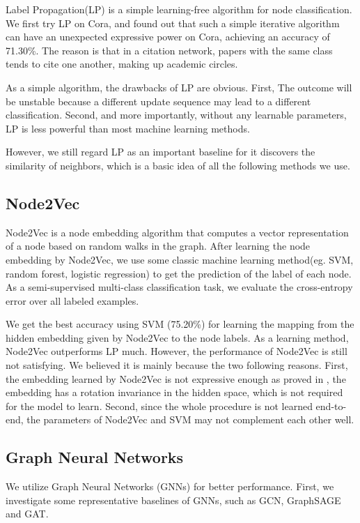 \documentclass[fleqn,10pt]{SelfArx} %
\begin{document}
Label Propagation(LP)\cite{zhuѓ2002learning} is a simple learning-free algorithm for node classification. We first try LP on Cora, and found out that such a simple iterative algorithm can have an unexpected expressive power on Cora, achieving an accuracy of 71.30\%. The reason is that in a citation network, papers with the same class tends to cite one another, making up academic circles.

As a simple algorithm, the drawbacks of LP are obvious. First, The outcome will be unstable because a different update sequence may lead to a different classification. Second, and more importantly, without any learnable parameters, LP is less powerful than most machine learning methods.

However, we still regard LP as an important baseline for it discovers the similarity of neighbors, which is a basic idea of all the following methods we use.

\subsection{Node2Vec}
Node2Vec\cite{grover2016node2vec} is a node embedding algorithm that computes a vector representation of a node based on random walks in the graph. 
After learning the node embedding by Node2Vec, we use some classic machine learning method(eg. SVM, random forest, logistic regression) to get the prediction of the label of each node. As a semi-supervised multi-class classification task, we evaluate the cross-entropy error over all labeled examples.

We get the best accuracy using SVM (75.20\%) for learning the mapping from the hidden embedding given by Node2Vec to the node labels. As a learning method, Node2Vec outperforms LP much. However, the performance of Node2Vec is still not satisfying. We believed it is mainly because the two following reasons. First, the embedding learned by Node2Vec is 
not expressive enough as proved in \cite{levy2014neural,hamilton2017inductive}, the embedding has a rotation invariance in the hidden space, which is not required for the model to learn. Second, since the whole procedure is not learned end-to-end, the parameters of Node2Vec and SVM may not complement each other well. 

\subsection{Graph Neural Networks}
We utilize Graph Neural Networks (GNNs) for better performance. First, we investigate some representative baselines of GNNs, such as GCN\cite{chen2020simple}, GraphSAGE\cite{hamilton2017inductive} and GAT\cite{velivckovic2017graph}.
\end{document}
